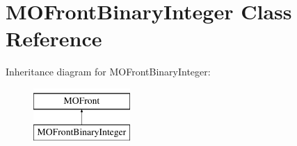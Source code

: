 \hypertarget{classMOFrontBinaryInteger}{}\section{M\+O\+Front\+Binary\+Integer Class Reference}
\label{classMOFrontBinaryInteger}
Inheritance diagram for M\+O\+Front\+Binary\+Integer\+:\begin{figure}[H]
\begin{center}
\leavevmode
\includegraphics[height=2.000000cm]{da/dbd/classMOFrontBinaryInteger}
\end{center}
\end{figure}
